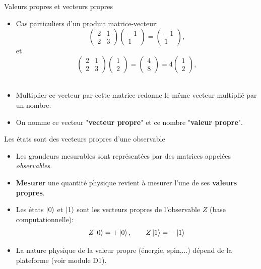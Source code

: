 \documentclass[aspectratio=169,12pt]{beamer}
\begin{document}
\begin{frame}{Valeurs propres et vecteurs propres}
  \begin{itemize}[<+->]
    \setlength{\itemsep}{0.6em}
    \item Cas particuliers d'un produit matrice-vecteur:   
    $$ \begin{pmatrix} 2 & 1 \\ 2 & 3 \end{pmatrix} \begin{pmatrix} -1 \\ 1 \end{pmatrix} = \begin{pmatrix} -1 \\ 1 \end{pmatrix},$$
    et 
    $$ \begin{pmatrix} 2 & 1 \\ 2 & 3 \end{pmatrix} \begin{pmatrix} 1 \\ 2 \end{pmatrix} = \begin{pmatrix} 4 \\ 8 \end{pmatrix} = 4 \begin{pmatrix} 1 \\ 2 \end{pmatrix},$$~\\
    \item Multiplier ce vecteur par cette matrice redonne le même vecteur multiplié par un nombre.
    \item On nomme ce vecteur "\textbf{vecteur propre}" et ce nombre "\textbf{valeur propre}".
  \end{itemize}
\end{frame}

\begin{frame}{Les états sont des vecteurs propres d'une observable}
  \begin{itemize}[<+->]
    \setlength{\itemsep}{0.6em}
    \item Les grandeurs mesurables sont représentées par des matrices appelées \textit{observables}.
    \item \textbf{Mesurer} une quantité physique revient à mesurer l'une de ses \textbf{valeurs propres}.
    \item Les états $\ket{0}$ et $\ket{1}$ sont les vecteurs propres de l'observable $Z$
     (base computationnelle):
    $$Z\ket{0} = +\ket{0}, \qquad Z\ket{1} = -\ket{1}$$
    \item La nature physique de la valeur propre (énergie, spin,...) dépend de la plateforme (voir module D1).
  \end{itemize}
\end{frame}
\end{document}
